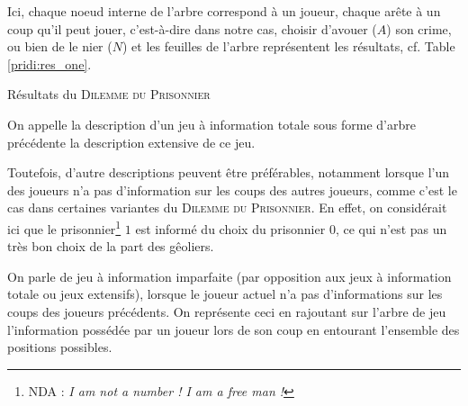 \documentclass{cours}
\begin{document}
Ici, chaque noeud interne de l'arbre correspond à un joueur, chaque arête à un coup qu'il peut jouer, c'est-à-dire dans notre cas, choisir d'avouer ($A$) son crime, ou bien de le nier ($N$) et les feuilles de l'arbre représentent les résultats, cf. Table \ref{pridi:res_one}.\\
\begin{table}[ht]
    \centering
    \caption{Résultats du \textsc{Dilemme du Prisonnier}}
    \label{pridi:res_one}
\end{table}
\begin{definition}
    On appelle la description d'un jeu à information totale sous forme d'arbre précédente la description extensive de ce jeu.
\end{definition}

Toutefois, d'autre descriptions peuvent être préférables, notamment lorsque l'un des joueurs n'a pas d'information sur les coups des autres joueurs, comme c'est le cas dans certaines variantes du \textsc{Dilemme du Prisonnier}. En effet, on considérait ici que le prisonnier\footnote{NDA : \textit{I am not a number ! I am a free man !}} $1$ est informé du choix du prisonnier $0$, ce qui n'est pas un très bon choix de la part des gêoliers.
\begin{definition}
    On parle de jeu à information imparfaite (par opposition aux jeux à information totale ou jeux extensifs), lorsque le joueur actuel n'a pas d'informations sur les coups des joueurs précédents. On représente ceci en rajoutant sur l'arbre de jeu l'information possédée par un joueur lors de son coup en entourant l'ensemble des positions possibles.
\end{definition}
\end{document}
